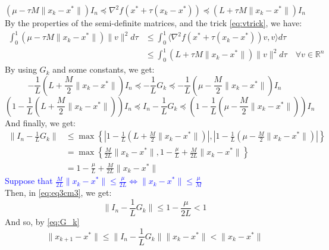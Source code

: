 \documentclass[12pt, openany]{report}
\newcommand{\R}{\mathbb{R}}
\theoremstyle{definition}
\begin{document}
\begin{equation*}
	(\mu - \tau M \|x_k -x^*\|)I_n \preceq \nabla^2f(x^*+\tau(x_k-x^*)) \preceq (L + \tau M \|x_k -x^*\|) I_n 
\end{equation*}
By the properties of the semi-definite matrices, and the trick \eqref{eq:vtrick}, we have:
\begin{equation}
	\begin{aligned}
		\int_{0}^{1} (\mu - \tau M \|x_k -x^*\|) \|v\|^2 d\tau &\leq \int_{0}^{1} \langle \nabla^2f(x^*+\tau(x_k-x^*)) v,v \rangle d\tau\\ 
		&\leq \int_{0}^{1} (L + \tau M \|x_k -x^*\|) \|v\|^2 d\tau \quad \forall v \in \R^n
	\end{aligned}
\end{equation}
By using $G_k$ and some constants, we get:
\begin{equation}
	-\frac{1}{L}(L+\frac{M}{2}\|x_k -x^*\|)I_n \preceq - \frac{1}{L} G_k \preceq -\frac{1}{L}(\mu - \frac{M}{2}\|x_k -x^*\|)I_n
\end{equation}
\begin{equation}
	\left(1-\frac{1}{L}(L+\frac{M}{2}\|x_k -x^*\|)\right)I_n \preceq I_n - \frac{1}{L}G_k \preceq \left(1-\frac{1}{L}(\mu - \frac{M}{2}\|x_k -x^*\|)\right)I_n
\end{equation}
And finally, we get:
\begin{equation}\label{eq:eq3cm3}
	\begin{aligned}
		\|I_n - \frac{1}{L}G_k\| &\leq \max\left\{\left|1-\frac{1}{L}(L + \frac{M}{2}\|x_k -x^*\|)\right|,\left|1-\frac{1}{L}(\mu - \frac{M}{2}\|x_k -x^*\|)\right|\right\}\\
		&= \max\left\{\frac{M}{2L}\|x_k -x^*\|, 1-\frac{\mu}{L}+\frac{M}{2L}\|x_k -x^*\|\right\}\\
		&= 1-\frac{\mu}{L}+\frac{M}{2L}\|x_k -x^*\|
	\end{aligned}
\end{equation}
\textcolor{blue}{Suppose that $\frac{M}{2L} \|x_k -x^*\| \leq \frac{\mu}{2L} \Longleftrightarrow \|x_k -x^*\| \leq \frac{\mu}{M}$}\\
Then, in \eqref{eq:eq3cm3}, we get:
\begin{equation}
	\|I_n - \frac{1}{L}G_k\| \leq 1-\frac{\mu}{2L} < 1
\end{equation}
And so, by \eqref{eq:G_k}
\begin{equation}\label{eq:bound_by_G_k}
	\|x_{k+1} - x^*\| \leq \|I_n - \frac{1}{L}G_k\| \|x_k -x^*\| < \|x_k -x^*\|
\end{equation}
\end{document}
